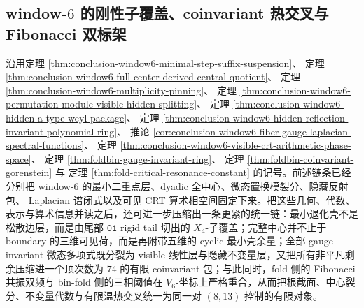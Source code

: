 \subsection{window-\texorpdfstring{$6$}{6} 的刚性子覆盖、coinvariant 热交叉与 Fibonacci 双标架}\label{subsec:conclusion-window6-subcover-coinvariant-thermal-resonance-lock}

沿用定理 \ref{thm:conclusion-window6-minimal-step-suffix-suspension}、
定理 \ref{thm:conclusion-window6-full-center-derived-central-quotient}、
定理 \ref{thm:conclusion-window6-multiplicity-pinning}、
定理 \ref{thm:conclusion-window6-permutation-module-visible-hidden-splitting}、
定理 \ref{thm:conclusion-window6-hidden-a-type-weyl-package}、
定理 \ref{thm:conclusion-window6-hidden-reflection-invariant-polynomial-ring}、
推论 \ref{cor:conclusion-window6-fiber-gauge-laplacian-spectral-functions}、
定理 \ref{thm:conclusion-window6-visible-crt-arithmetic-phase-space}、
定理 \ref{thm:foldbin-gauge-invariant-ring}、
定理 \ref{thm:foldbin-coinvariant-gorenstein} 与
定理 \ref{thm:fold-critical-resonance-constant} 的记号。前述链条已经分别把
window-\(6\) 的最小二重点层、dyadic 全中心、微态置换模裂分、隐藏反射包、
Laplacian 谱闭式以及可见 CRT 算术相空间固定下来。把这些几何、代数、表示与算术信息并读之后，还可进一步压缩出一条更紧的统一链：最小退化壳不是松散边层，而是由尾部 \(\mathtt{01}\) rigid tail 切出的 \(X_4\)-子覆盖；完整中心并不止于 boundary 的三维可见荷，而是再附带五维的 cyclic 最小壳余量；全部 gauge-invariant 微态多项式既分裂为 visible 线性层与隐藏不变量层，又把所有非平凡剩余压缩进一个顶次数为 \(74\) 的有限 coinvariant 包；与此同时，fold 侧的 Fibonacci 共振双频与 bin-fold 侧的三相阈值在 \(V_6\)-坐标上严格重合，从而把根截面、中心裂分、不变量代数与有限温热交叉统一为同一对 \((8,13)\) 控制的有限对象。

